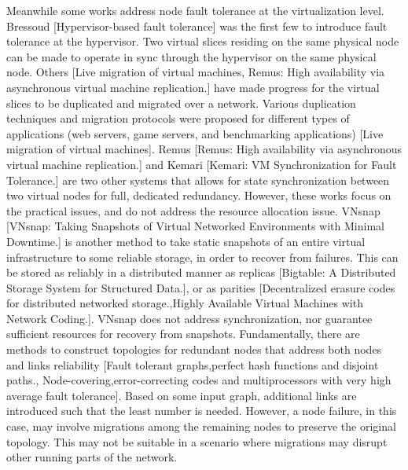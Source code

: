 Meanwhile some works address node fault tolerance at the virtualization level. Bressoud [Hypervisor-based fault tolerance] was the first few to introduce fault tolerance at the hypervisor. Two virtual slices residing on the same physical node can be made to operate in sync through the hypervisor on the same physical node. Others [Live migration of virtual machines, Remus: High availability via asynchronous virtual machine replication.] have made progress for the virtual slices to be duplicated and migrated over a network. Various duplication techniques and migration protocols were proposed for different types of applications (web servers, game servers, and benchmarking applications) [Live migration of virtual machines]. Remus [Remus: High availability via asynchronous virtual machine replication.] and Kemari [Kemari: VM Synchronization for Fault Tolerance.] are two other systems that allows for state synchronization between two virtual nodes for full, dedicated
redundancy. However, these works focus on the practical issues, and do not address the resource allocation issue. VNsnap [VNsnap: Taking Snapshots of Virtual Networked Environments with Minimal Downtime.] is another method to take static snapshots of an entire virtual infrastructure to some reliable storage, in order to recover from failures. This can be stored as reliably
in a distributed manner as replicas [Bigtable: A Distributed Storage System for Structured Data.], or as parities [Decentralized erasure codes for
distributed networked storage.,Highly Available Virtual Machines with Network Coding.]. VNsnap does not address synchronization, nor guarantee sufficient resources for recovery from snapshots. Fundamentally, there are methods to construct topologies for redundant nodes that address both nodes and links reliability [Fault tolerant graphs,perfect hash functions and disjoint paths., Node-covering,error-correcting codes and multiprocessors with very high average fault tolerance]. Based on some input graph, additional links are introduced such that the least number is needed. However, a node failure, in this case, may involve migrations among the remaining nodes to preserve the original topology. This may not be suitable in a scenario where migrations
may disrupt other running parts of the network.

